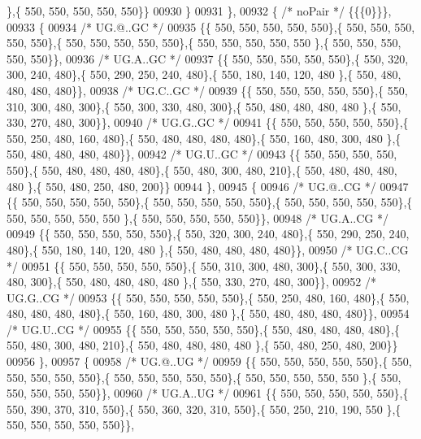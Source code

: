 \begin{DoxyCode}
      \},\{ 550, 550, 550, 550, 550\}\}
00930 \}
00931 \},
00932 \{ \textcolor{comment}{/* noPair */} \{\{\{0\}\}\},
00933 \{
00934 \textcolor{comment}{/* UG.@..GC */}
00935 \{\{ 550, 550, 550, 550, 550\},\{ 550, 550, 550, 550, 550\},\{ 550, 550, 550, 550, 550\},\{ 550, 550, 550, 550, 550
      \},\{ 550, 550, 550, 550, 550\}\},
00936 \textcolor{comment}{/* UG.A..GC */}
00937 \{\{ 550, 550, 550, 550, 550\},\{ 550, 320, 300, 240, 480\},\{ 550, 290, 250, 240, 480\},\{ 550, 180, 140, 120, 480
      \},\{ 550, 480, 480, 480, 480\}\},
00938 \textcolor{comment}{/* UG.C..GC */}
00939 \{\{ 550, 550, 550, 550, 550\},\{ 550, 310, 300, 480, 300\},\{ 550, 300, 330, 480, 300\},\{ 550, 480, 480, 480, 480
      \},\{ 550, 330, 270, 480, 300\}\},
00940 \textcolor{comment}{/* UG.G..GC */}
00941 \{\{ 550, 550, 550, 550, 550\},\{ 550, 250, 480, 160, 480\},\{ 550, 480, 480, 480, 480\},\{ 550, 160, 480, 300, 480
      \},\{ 550, 480, 480, 480, 480\}\},
00942 \textcolor{comment}{/* UG.U..GC */}
00943 \{\{ 550, 550, 550, 550, 550\},\{ 550, 480, 480, 480, 480\},\{ 550, 480, 300, 480, 210\},\{ 550, 480, 480, 480, 480
      \},\{ 550, 480, 250, 480, 200\}\}
00944 \},
00945 \{
00946 \textcolor{comment}{/* UG.@..CG */}
00947 \{\{ 550, 550, 550, 550, 550\},\{ 550, 550, 550, 550, 550\},\{ 550, 550, 550, 550, 550\},\{ 550, 550, 550, 550, 550
      \},\{ 550, 550, 550, 550, 550\}\},
00948 \textcolor{comment}{/* UG.A..CG */}
00949 \{\{ 550, 550, 550, 550, 550\},\{ 550, 320, 300, 240, 480\},\{ 550, 290, 250, 240, 480\},\{ 550, 180, 140, 120, 480
      \},\{ 550, 480, 480, 480, 480\}\},
00950 \textcolor{comment}{/* UG.C..CG */}
00951 \{\{ 550, 550, 550, 550, 550\},\{ 550, 310, 300, 480, 300\},\{ 550, 300, 330, 480, 300\},\{ 550, 480, 480, 480, 480
      \},\{ 550, 330, 270, 480, 300\}\},
00952 \textcolor{comment}{/* UG.G..CG */}
00953 \{\{ 550, 550, 550, 550, 550\},\{ 550, 250, 480, 160, 480\},\{ 550, 480, 480, 480, 480\},\{ 550, 160, 480, 300, 480
      \},\{ 550, 480, 480, 480, 480\}\},
00954 \textcolor{comment}{/* UG.U..CG */}
00955 \{\{ 550, 550, 550, 550, 550\},\{ 550, 480, 480, 480, 480\},\{ 550, 480, 300, 480, 210\},\{ 550, 480, 480, 480, 480
      \},\{ 550, 480, 250, 480, 200\}\}
00956 \},
00957 \{
00958 \textcolor{comment}{/* UG.@..UG */}
00959 \{\{ 550, 550, 550, 550, 550\},\{ 550, 550, 550, 550, 550\},\{ 550, 550, 550, 550, 550\},\{ 550, 550, 550, 550, 550
      \},\{ 550, 550, 550, 550, 550\}\},
00960 \textcolor{comment}{/* UG.A..UG */}
00961 \{\{ 550, 550, 550, 550, 550\},\{ 550, 390, 370, 310, 550\},\{ 550, 360, 320, 310, 550\},\{ 550, 250, 210, 190, 550
      \},\{ 550, 550, 550, 550, 550\}\},

\end{DoxyCode}
